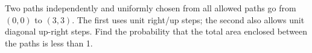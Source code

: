 Two paths independently and uniformly chosen from all allowed paths go from $(0,0)$ to $(3,3)$. The first uses unit right/up steps; the second also allows unit diagonal up-right steps. Find the probability that the total area enclosed between the paths is less than 1.
